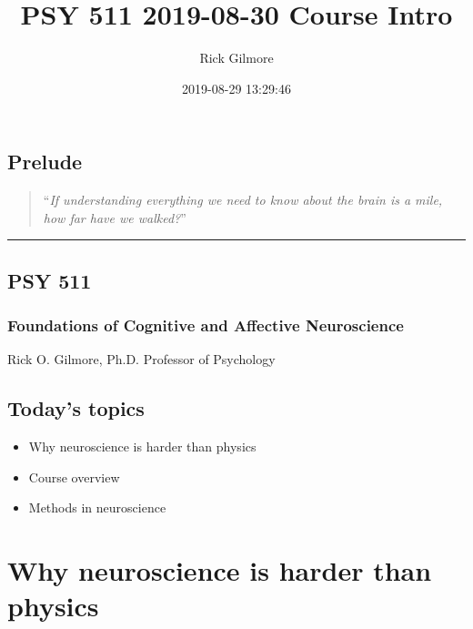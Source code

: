 \documentclass[]{article}
\title{PSY 511 2019-08-30 Course Intro}
\author{Rick Gilmore}
\date{2019-08-29 13:29:46}
\providecommand{\tightlist}{%
  \setlength{\itemsep}{0pt}\setlength{\parskip}{0pt}}
\begin{document}
\maketitle

{
\setcounter{tocdepth}{1}
\tableofcontents
}
\hypertarget{prelude}{%
\subsection{Prelude}\label{prelude}}

\begin{quote}
``\emph{If understanding everything we need to know about the brain is a
mile, how far have we walked?}''
\end{quote}

\begin{center}\rule{0.5\linewidth}{\linethickness}\end{center}

\hypertarget{psy-511}{%
\subsection{PSY 511}\label{psy-511}}

\hypertarget{foundations-of-cognitive-and-affective-neuroscience}{%
\subsubsection{Foundations of Cognitive and Affective
Neuroscience}\label{foundations-of-cognitive-and-affective-neuroscience}}

Rick O. Gilmore, Ph.D. Professor of Psychology

\hypertarget{todays-topics}{%
\subsection{Today's topics}\label{todays-topics}}

\begin{itemize}
\tightlist
\item
  Why neuroscience is harder than physics
\item
  Course overview
\item
  Methods in neuroscience
\end{itemize}

\hypertarget{why-neuroscience-is-harder-than-physics}{%
\section{Why neuroscience is harder than
physics}\label{why-neuroscience-is-harder-than-physics}}
\end{document}
